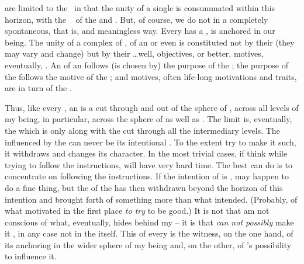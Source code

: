 \pa\label{acts}  are limited to the \hoa\ in that the unity of a single
 is consummated within this horizon, with the \equi\  of the
 and .  But, of course, we do not 
in a completely spontaneous, that is,  and meaningless way.
Every  has a , is anchored in our being.  The unity of a
complex of , of an  or even  is constituted not
by their  (they may vary and change) but by their \ldots well,
objectives, or better, motives, eventually, .  An 
of an  follows (is chosen by) the purpose of the ; the
purpose of the  follows the motive of the ; and motives,
often life-long motivations and traits, are in turn  of the
.

Thus, like every , an  is a cut through and out of
the sphere of , across all levels of my being, in particular,
across the sphere of  as well as .  The
 limit is, eventually, the  which is  only
along with the cut through all the intermediary levels.
The  influenced by the  can never be its
intentional .  To the extent  try to make it such, it withdraws
and changes its character.  In the most trivial cases, if  think  while trying to follow
the instructions,  will have very hard time.  The best  can do is to
concentrate on following the instructions.  If the intention of  is
,  may happen to do a fine thing, but the  of the  has then withdrawn beyond the horizon of this
intention and brought forth  of something more than what 
intended.  (Probably, of what motivated  in the first place {\em to try}
to be good.)  It is not that  am not conscious of what, eventually,
hides behind my  -- it is that  {\em can not possibly} make it
, in any case not in the  itself.
This  of every  is the witness, on the one hand, of its
anchoring in the wider sphere of my being and, on the other, of 's possibility
to influence it. 

